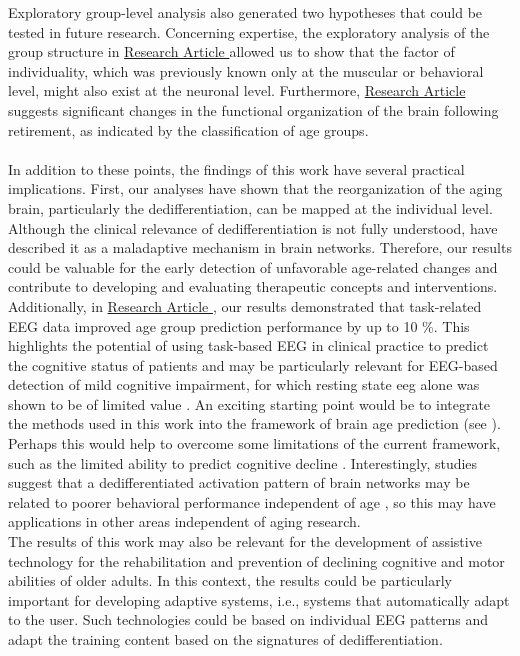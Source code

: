 Exploratory group-level analysis also generated two hypotheses that could be tested in future research. Concerning expertise, the exploratory analysis of the group structure in \hyperref[results:paperIII]{Research Article } allowed us to show that the factor of individuality, which was previously known only at the muscular or behavioral level, might also exist at the neuronal level. Furthermore, \hyperref[results:paperII]{Research Article } suggests significant changes in the functional organization of the brain following retirement, as indicated by the classification of age groups.\\
\\
In addition to these points, the findings of this work have several practical implications. First, our analyses have shown that the reorganization of the aging brain, particularly the dedifferentiation, can be mapped at the individual level. Although the clinical relevance of dedifferentiation is not fully understood, \citeauthor{Fornito2015} \cite{Fornito2015} have described it as a maladaptive mechanism in brain networks. Therefore, our results could be valuable for the early detection of unfavorable age-related changes and contribute to developing and evaluating therapeutic concepts and interventions.\\
Additionally, in \hyperref[results:paperII]{Research Article }, our results demonstrated that task-related EEG data improved age group prediction performance by up to 10 \%. This highlights the potential of using task-based EEG in clinical practice to predict the cognitive status of patients and may be particularly relevant for EEG-based detection of mild cognitive impairment, for which resting state \gls{eeg} alone was shown to be of limited value \cite{Froehlich2021, Farina2020}. An exciting starting point would be to integrate the methods used in this work into the framework of brain age prediction (see ). Perhaps this would help to overcome some limitations of the current framework, such as the limited ability to predict cognitive decline \cite{Tetereva2023}. Interestingly, studies suggest that a dedifferentiated activation pattern of brain networks may be related to poorer behavioral performance independent of age \cite{Koen2019}, so this may have applications in other areas independent of aging research.\\
The results of this work may also be relevant for the development of assistive technology for the rehabilitation and prevention of declining cognitive and motor abilities of older adults. In this context, the results could be particularly important for developing adaptive systems, i.e., systems that automatically adapt to the user. Such technologies could be based on individual EEG patterns and adapt the training content based on the signatures of dedifferentiation.\\
